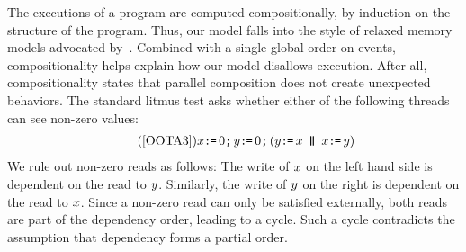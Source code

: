
The executions of a program are computed compositionally, by induction on the
structure of the program.  Thus, our model falls into the style of relaxed
memory models advocated by~\citet{Batty17}.  Combined with a single global
order on events, compositionality helps explain how our model disallows
\oota{} execution.  After all, compositionality states that parallel
composition does not create unexpected
behaviors.  %
The standard \oota{} litmus test asks whether either of the following threads
can see non-zero values:
\begin{gather*}
  \tag{\ref{OOTA3}}
  x\GETS0\SEMI y\GETS0\SEMI
  (\bLoc \GETS \aLoc \PAR \aLoc \GETS \bLoc)
\end{gather*}
We rule out non-zero reads as follows: The write of $x$ on the left hand
side is dependent on the read to $y$.  Similarly, the write of $y$ on
the right is dependent on the read to $x$.  Since a non-zero read can
only be satisfied externally, both reads are part of the dependency order,
leading to a cycle.  Such a cycle contradicts the assumption that dependency
forms a partial order.








